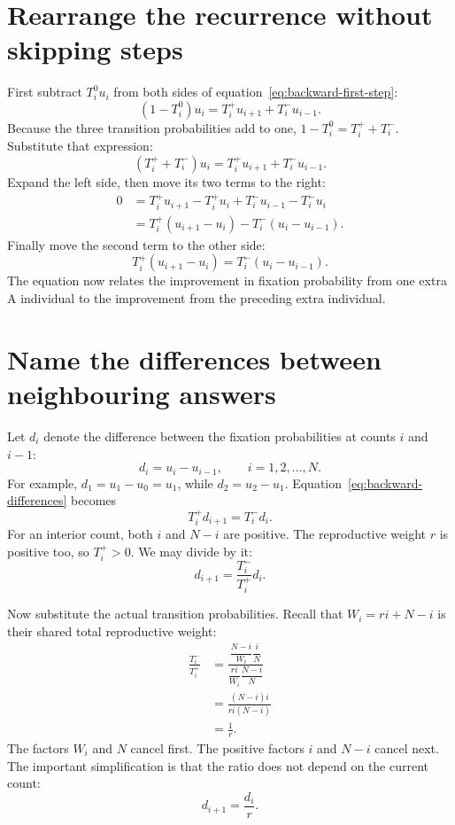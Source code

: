 \section{Rearrange the recurrence without skipping steps}

First subtract \(T_i^0u_i\) from both sides of
equation~\eqref{eq:backward-first-step}:
\[
 (1-T_i^0)u_i=T_i^+u_{i+1}+T_i^-u_{i-1}.
\]
Because the three transition probabilities add to one,
\(1-T_i^0=T_i^++T_i^-\). Substitute that expression:
\[
 (T_i^++T_i^-)u_i=T_i^+u_{i+1}+T_i^-u_{i-1}.
\]
Expand the left side, then move its two terms to the right:
\begin{align*}
 0&=T_i^+u_{i+1}-T_i^+u_i+T_i^-u_{i-1}-T_i^-u_i\\
  &=T_i^+(u_{i+1}-u_i)-T_i^-(u_i-u_{i-1}).
\end{align*}
Finally move the second term to the other side:
\begin{equation}
 T_i^+(u_{i+1}-u_i)=T_i^-(u_i-u_{i-1}).
 \label{eq:backward-differences}
\end{equation}
The equation now relates the improvement in fixation probability from one
extra A individual to the improvement from the preceding extra individual.

\section{Name the differences between neighbouring answers}

Let \(d_i\) denote the difference between the fixation probabilities at
counts \(i\) and \(i-1\):
\[
 d_i=u_i-u_{i-1},\qquad i=1,2,\ldots,N.
\]
For example, \(d_1=u_1-u_0=u_1\), while \(d_2=u_2-u_1\).
Equation~\eqref{eq:backward-differences} becomes
\[
 T_i^+d_{i+1}=T_i^-d_i.
\]
For an interior count, both \(i\) and \(N-i\) are positive. The
reproductive weight \(r\) is positive too, so \(T_i^+>0\). We may divide
by it:
\begin{equation}
 d_{i+1}=\frac{T_i^-}{T_i^+}d_i.
 \label{eq:difference-ratio}
\end{equation}

Now substitute the actual transition probabilities. Recall that
\(W_i=ri+N-i\) is their shared total reproductive weight:
\begin{align*}
 \frac{T_i^-}{T_i^+}
 &=\frac{\dfrac{N-i}{W_i}\dfrac{i}{N}}
          {\dfrac{ri}{W_i}\dfrac{N-i}{N}}\\[4pt]
 &=\frac{(N-i)i}{ri(N-i)}\\
 &=\frac1r.
\end{align*}
The factors \(W_i\) and \(N\) cancel first. The positive factors \(i\)
and \(N-i\) cancel next. The important simplification is that the ratio
does not depend on the current count:
\[
 d_{i+1}=\frac{d_i}{r}.
\]

